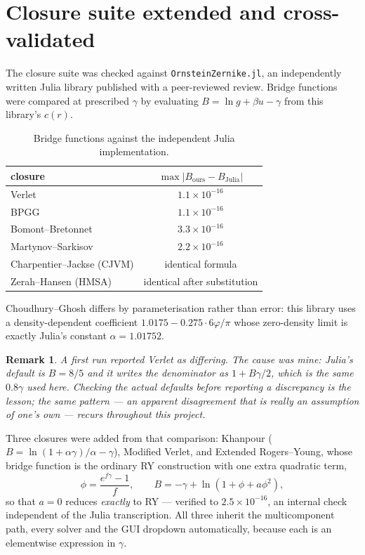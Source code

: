 \documentclass[11pt,a4paper]{article}
\newtheorem{remark}{Remark}
\newcommand{\code}[1]{\texttt{#1}}
\begin{document}
\section{Closure suite extended and cross-validated}
\label{mc:sec:closures}

The closure suite was checked against \code{OrnsteinZernike.jl}, an
independently written Julia library published with a peer-reviewed review.
Bridge functions were compared at prescribed $\gamma$ by evaluating
$B=\ln g+\beta u-\gamma$ from this library's $c(r)$.

\begin{table}[htbp]
\centering
\caption{Bridge functions against the independent Julia implementation.}
\begin{tabular}{lc}
\toprule
closure & $\max|B_{\text{ours}}-B_{\text{Julia}}|$\\
\midrule
Verlet                & $1.1\times10^{-16}$\\
BPGG                  & $1.1\times10^{-16}$\\
Bomont--Bretonnet     & $3.3\times10^{-16}$\\
Martynov--Sarkisov    & $2.2\times10^{-16}$\\
Charpentier--Jackse (CJVM) & identical formula\\
Zerah--Hansen (HMSA)  & identical after substitution\\
\bottomrule
\end{tabular}
\end{table}

Choudhury--Ghosh differs by parameterisation rather than error: this library
uses a density-dependent coefficient $1.0175-0.275\cdot6\varphi/\pi$ whose
zero-density limit is exactly Julia's constant $\alpha=1.01752$.

\begin{remark}
A first run reported Verlet as differing. The cause was mine: Julia's default
is $B=8/5$ and it writes the denominator as $1+B\gamma/2$, which is the same
$0.8\gamma$ used here. Checking the actual defaults before reporting a
discrepancy is the lesson; the same pattern --- an apparent disagreement that
is really an assumption of one's own --- recurs throughout this project.
\end{remark}

Three closures were added from that comparison: Khanpour
($B=\ln(1+\alpha\gamma)/\alpha-\gamma$), Modified Verlet, and Extended
Rogers--Young, whose bridge function is the ordinary RY construction with one
extra quadratic term,
\begin{equation}
\phi=\frac{e^{f\gamma}-1}{f},
\qquad
B=-\gamma+\ln\!\left(1+\phi+a\phi^2\right),
\end{equation}
so that $a=0$ reduces \emph{exactly} to RY --- verified to
$2.5\times10^{-16}$, an internal check independent of the Julia transcription.
All three inherit the multicomponent path, every solver and the GUI dropdown
automatically, because each is an elementwise expression in $\gamma$.
\end{document}
